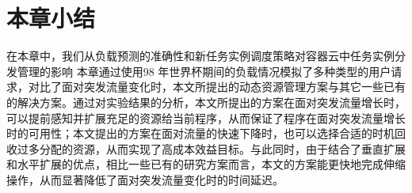 \section{本章小结}
在本章中，我们从负载预测的准确性和新任务实例调度策略对容器云中任务实例分发管理的影响
本章通过使用98 年世界杯期间的负载情况模拟了多种类型的用户请求，对比了面对突发流量变化时，本文所提出的动态资源管理方案与其它一些已有的解决方案。通过对实验结果的分析，本文所提出的方案在面对突发流量增长时，可以提前感知并扩展充足的资源给当前程序，从而保证了程序在面对突发流量增长时的可用性；本文提出的方案在面对流量的快速下降时，也可以选择合适的时机回收过多分配的资源，从而实现了高成本效益目标。与此同时，由于结合了垂直扩展和水平扩展的优点，相比一些已有的研究方案而言，本文的方案能更快地完成伸缩操作，从而显著降低了面对突发流量变化时的时间延迟。
